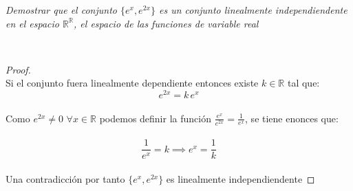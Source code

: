 \documentclass[11pt,letterpaper]{article}
\newcommand{\R}{\mathbb{R}}
\begin{document}
\begin{tcolorbox}[
	title = \textcolor{black}{\textcolor{white}{Problema 12}},]
\textit{Demostrar que el conjunto $\{e^x,e^{2x}\}$ es un conjunto linealmente independiendente en el espacio $\R^{\R}$, el espacio de 
las funciones de variable real
}
\end{tcolorbox}\,\\
\begin{proof}\,\\
    Si el conjunto fuera linealmente dependiente entonces existe $k\in \R$ tal que:\,\\
    \begin{equation*}
        e^{2x}=k\,e^{x}
    \end{equation*}\,\\
    Como $e^{2x}\neq 0$ $\forall x\in \R$ podemos definir la funci\'on $\frac{e^x}{e^{2x}}=\frac{1}{e^x}$, se tiene enonces que:\,\\
    \,\\
    \begin{equation*}
        \frac{1}{e^x}=k\implies e^x=\frac{1}{k}
    \end{equation*}\,\\
    Una contradicci\'on por tanto $\{e^x,e^{2x}\}$ es linealmente independiendente
\end{proof}\,\\
\end{document}
